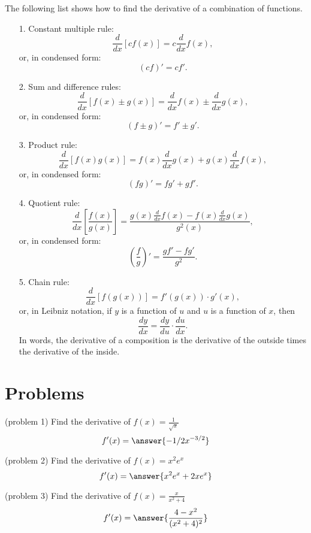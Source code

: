 \documentclass[handout]{ximera}
\begin{document}
The following list shows how to find the derivative of a combination of functions.

\begin{enumerate}

\item[1.] Constant multiple rule:
\[
\frac{d}{dx} \left[cf(x)\right] = c \frac{d}{dx} f(x),
\]
or, in condensed form:
\[
(cf)' = cf'.
\]

\item[2.] Sum and difference rules:
\[
\frac{d}{dx} \left[f(x) \pm g(x)\right] = \frac{d}{dx} f(x) \pm \frac{d}{dx} g(x),
\]
or, in condensed form:
\[
(f \pm g)' = f' \pm g'.
\]

\item[3.] Product rule:
\[
\frac{d}{dx} \left[f(x)g(x)\right] = f(x) \frac{d}{dx} g(x) + g(x) \frac{d}{dx} f(x),
\]
or, in condensed form:
\[
(fg)' = fg' + gf'.
\]

\item[4.] Quotient rule:
\[
\frac{d}{dx} \left[\frac{f(x)}{g(x)}\right] = \frac{g(x) \frac{d}{dx} f(x) - f(x) \frac{d}{dx} g(x)}{g^2(x)},
\]
or, in condensed form:
\[
\left(\frac{f}{g}\right)' =  \frac{gf' - fg'}{g^2}.
\]

\item[5.] Chain rule:
\[
\frac{d}{dx} \left[f(g(x))\right] = f'(g(x)) \cdot g'(x),
\]
or, in Leibniz notation, if $y$ is a function of $u$ and $u$ is a function of $x$, then
\[
\frac{dy}{dx} = \frac{dy}{du} \cdot \frac{du}{dx}.
\]
In words, the derivative of a composition is the derivative of the outside times the derivative of the inside.

\end{enumerate}


\section{Problems}

\begin{problem} (problem 1)
Find the derivative of $\displaystyle f(x) = \frac{1}{\sqrt x}$
\[
f'(x) = \answer{-1/2 x^{-3/2}}
\]
\end{problem}

\begin{problem} (problem 2)
Find the derivative of $f(x) = x^2e^x$
\[
f'(x) = \answer{x^2e^x + 2xe^x}
\]
\end{problem}

\begin{problem} (problem 3)
Find the derivative of $\displaystyle f(x) = \frac{x}{x^2+4}$
\[
f'(x) = \answer{\frac{4-x^2}{(x^2 + 4)^2}}
\]
\end{problem}
\end{document}
